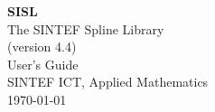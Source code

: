 \def \RR{\hbox{\rm I\negthinspace R}}

\pagestyle{headings}
\makeindex


\begin{titlepage}
  \vspace{5 cm}
  \begin{center}
  \Huge
  \textbf{SISL} \\
  \huge
  The SINTEF Spline Library \\ 
  \LARGE
  (version 4.4)\\ 
  User's Guide \\
  \vspace{10 mm}
  \large
  SINTEF ICT, Applied Mathematics \\
  \today
  \end{center}

\end{titlepage}


\tableofcontents
\cleardoublepage
{}
\setcounter{page}{1}






\cleardoublepage

